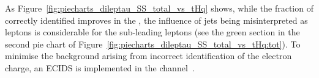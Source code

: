 As Figure~\ref{fig:piecharts_dileptau_SS_total_vs_tHq} shows, while the fraction of correctly identified \tauhad improves in the \dilepSStau,
the influence of jets being misinterpreted as leptons is considerable for the
sub-leading leptons (see the green section in the second pie chart of 
Figure~\ref{fig:piecharts_dileptau_SS_total_vs_tHq:tot}).
To minimise the background arising from incorrect identification of the electron charge, an ECIDS
 is implemented in the \dilepSStau channel~\cite{ATLAS:2019qmc}.










